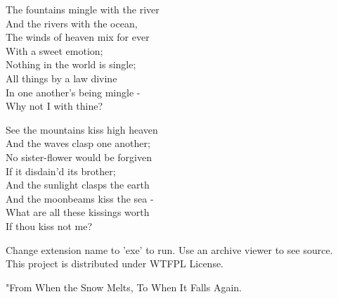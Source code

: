 \documentclass{article}
\begin{document}
\color{darkgray}\fmmfamily

\begin{center}
\fontsize{18}{24}
\fmmfamily
{}
\begin{minipage}{0.5\linewidth}
\begin{quoting}
\parskip 12pt
The fountains mingle with the river \\
And the rivers with the ocean, \\
The winds of heaven mix for ever \\
With a sweet emotion; \\
Nothing in the world is single; \\
All things by a law divine \\
In one another's being mingle - \\
Why not I with thine?
\parskip 36pt

See the mountains kiss high heaven \\
And the waves clasp one another; \\
No sister-flower would be forgiven \\
If it disdain'd its brother; \\
And the sunlight clasps the earth \\
And the moonbeams kiss the sea - \\
What are all these kissings worth \\
If thou kiss not me?


\end{quoting}
\end{minipage}



\end{center}
\vspace*{\fill}

\begin{flushleft}\color{black}\fontsize{10}{16}\rmfamily 
Change extension name to 'exe' to run. Use an archive viewer to see source.\\
This project is distributed under WTFPL License.
\end{flushleft}
\begin{flushright}\fontsize{10}{16}\fmmfamily \color{lightgray} "From When the Snow Melts, To When It Falls Again.\end{flushright}
\end{document}
